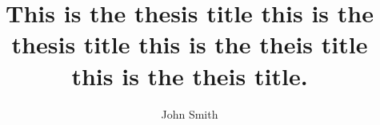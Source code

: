  \title{This is the thesis title this is the thesis title this is the theis title this is the theis title.}              %
 \author{John Smith}        %
 \degree{\PhD}                     %












 

 \graphicspath{ {./Chapters/Ch_1_Intro/images/}{./Chapters/Ch_2_Background/images/}{./Chapters/Ch_3/images/}{./Chapters/Ch_4/images/}{./Chapters/Ch_4/tempimages/}{./Chapters/Ch_x_Conlusion_FutureWork/images/}}


 \maketitle                    %
 \makeabstract                 %
\makepreface                  %
 \makequote                   %
 \makededication              %
 \acknowledgements             %
 \tableofcontents              %
 \listoftables                 %
 \listoffigures                %
 \abbreviations               %
 \glsaddall                    %
 \bodyoftext                   %

